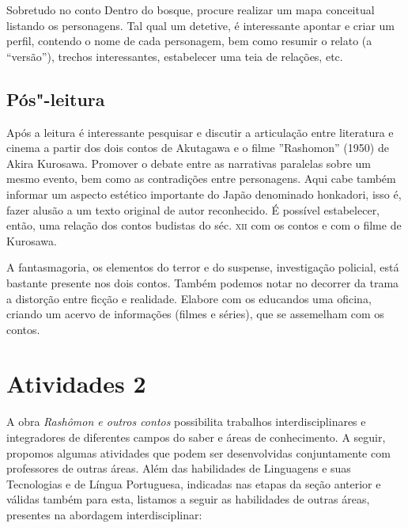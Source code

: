\documentclass[12pt]{extarticle}
\begin{document}
Sobretudo no conto Dentro do bosque, procure realizar um mapa conceitual
listando os personagens. Tal qual um detetive, é interessante apontar e
criar um perfil, contendo o nome de cada personagem, bem como resumir o
relato (a ``versão''), trechos interessantes, estabelecer uma teia de
relações, etc.

\subsection{Pós"-leitura}


Após a leitura é interessante pesquisar e discutir a
articulação entre literatura e cinema a partir dos dois contos de
Akutagawa e o filme ''Rashomon'' (1950) de Akira Kurosawa. Promover o
debate entre as narrativas paralelas sobre um mesmo evento, bem como as
contradições entre personagens. Aqui cabe também informar um aspecto
estético importante do Japão denominado honkadori, isso é, fazer alusão
a um texto original de autor reconhecido. É possível estabelecer, então,
uma relação dos contos budistas do séc. \textsc{xii} com os contos e com o filme
de Kurosawa.

A fantasmagoria, os elementos do terror e do suspense, investigação
policial, está bastante presente nos dois contos. Também podemos notar
no decorrer da trama a distorção entre ficção e realidade. Elabore com
os educandos uma oficina, criando um acervo de informações (filmes e
séries), que se assemelham com os contos.


\section{Atividades 2}

A obra \emph{Rashômon e outros contos} possibilita trabalhos
interdisciplinares e integradores de diferentes campos do saber e áreas
de conhecimento. A seguir, propomos algumas atividades que podem ser
desenvolvidas conjuntamente com professores de outras áreas. Além das
habilidades de Linguagens e suas Tecnologias e de Língua Portuguesa,
indicadas nas etapas da seção anterior e válidas também para esta,
listamos a seguir as habilidades de outras áreas, presentes na abordagem
interdisciplinar:

\end{document}
